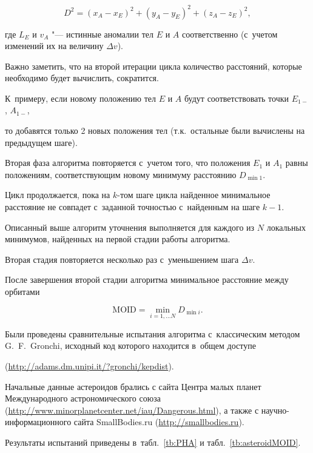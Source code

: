 \begin{equation}

	D^2 = (x_A - x_E)^2 + (y_A - y_E)^2 + (z_A - z_E)^2,

\end{equation}

где $L_E$ и $v_A$ "--- истинные аномалии тел $E$ и $A$ соответственно (с~учетом изменений их на величину $\Delta v$).



Важно заметить, что на второй итерации цикла количество расстояний, которые необходимо будет вычислить, сократится. 

К~примеру, если новому положению тел $E$ и $A$ будут соответствовать точки $E_{1-}$, $A_{1-}$, 

то добавятся только 2 новых положения тел (т.к.~остальные были вычислены на предыдущем шаге).



Вторая фаза алгоритма повторяется с~учетом того, что положения $E_1$ и $A_1$ равны положениям, соответствующим новому минимуму расстоянию $D_{\min 1}$. 

Цикл продолжается, пока на $k$-том шаге цикла найденное минимальное расстояние не совпадет с~заданной точностью с~найденным на шаге $k-1$.



Описанный выше алгоритм уточнения выполняется для каждого из $N$ локальных минимумов, найденных на первой стадии работы алгоритма. 

Вторая стадия повторяется несколько раз с~уменьшением шага $\Delta v$. 

После завершения второй стадии алгоритма минимальное расстояние между орбитами 

$$\text{MOID} = \min\limits_{i=1,\dots N} D_{\min i}.$$



Были проведены сравнительные испытания алгоритма с~классическим методом \mbox{G.~F.~Gronchi}, исходный код которого находится в~общем доступе %

\mbox{(\url{http://adams.dm.unipi.it/?gronchi/kepdist})}. 

Начальные данные астероидов брались с сайта Центра малых планет Международного астрономического союза (\url{http://www.minorplanetcenter.net/iau/Dangerous.html}), а также с научно-информационного сайта SmallBodies.ru (\url{http://smallbodies.ru}). 

Результаты испытаний приведены в~табл.~\ref{tb:PHA} и табл.~\ref{tb:asteroidMOID}.



